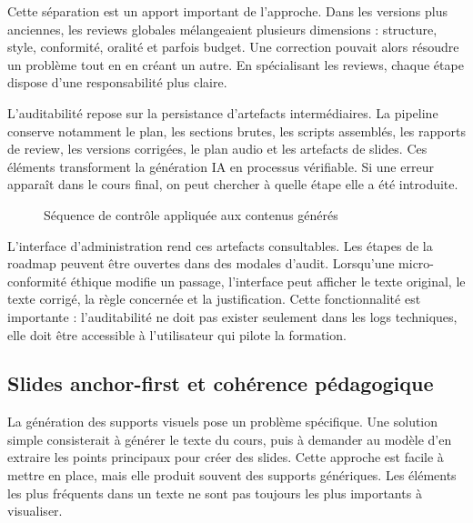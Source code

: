 \documentclass[12pt,a4paper]{article}
\begin{document}
Cette séparation est un apport important de l'approche. Dans les versions plus anciennes,
les reviews globales mélangeaient plusieurs dimensions : structure, style, conformité,
oralité et parfois budget. Une correction pouvait alors résoudre un problème tout en en
créant un autre. En spécialisant les reviews, chaque étape dispose d'une responsabilité
plus claire.

L'auditabilité repose sur la persistance d'artefacts intermédiaires. La pipeline conserve
notamment le plan, les sections brutes, les scripts assemblés, les rapports de review, les
versions corrigées, le plan audio et les artefacts de slides. Ces éléments transforment la
génération IA en processus vérifiable. Si une erreur apparaît dans le cours final, on peut
chercher à quelle étape elle a été introduite.

\begin{figure}[h]
\centering
{}
\caption{Séquence de contrôle appliquée aux contenus générés}
\end{figure}

L'interface d'administration rend ces artefacts consultables. Les étapes de la roadmap
peuvent être ouvertes dans des modales d'audit. Lorsqu'une micro-conformité éthique
modifie un passage, l'interface peut afficher le texte original, le texte corrigé, la règle
concernée et la justification. Cette fonctionnalité est importante : l'auditabilité ne doit
pas exister seulement dans les logs techniques, elle doit être accessible à l'utilisateur qui
pilote la formation.

\subsection{Slides anchor-first et cohérence pédagogique}

La génération des supports visuels pose un problème spécifique. Une solution simple
consisterait à générer le texte du cours, puis à demander au modèle d'en extraire les
points principaux pour créer des slides. Cette approche est facile à mettre en place, mais
elle produit souvent des supports génériques. Les éléments les plus fréquents dans un
texte ne sont pas toujours les plus importants à visualiser.
\end{document}
